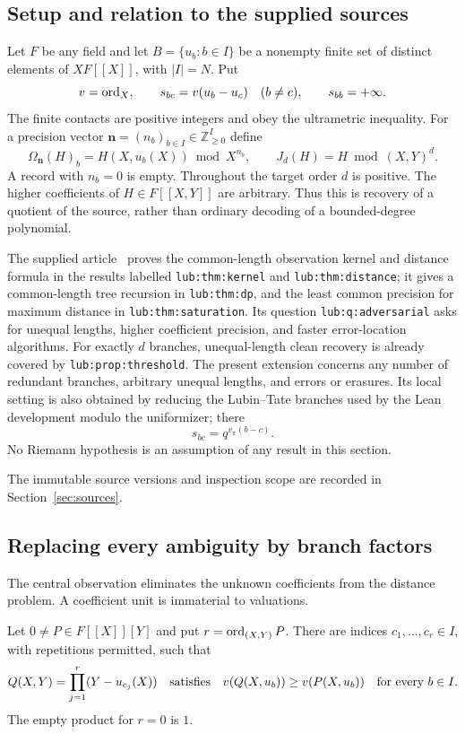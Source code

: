 \subsection{Setup and relation to the supplied sources}

Let $F$ be any field and let $B=\{u_b:b\in I\}$ be a nonempty finite set
of distinct elements of $XF[[X]]$, with $|I|=N$. Put
\[
 v=\operatorname{ord}_X,\qquad s_{bc}=v(u_b-u_c)\quad(b\ne c),\qquad s_{bb}=+\infty.
\]
The finite contacts are positive integers and obey the ultrametric inequality.
For a precision vector $\mathbf n=(n_b)_{b\in I}\in\mathbb Z_{\ge0}^I$ define
\[
 \Omega_{\mathbf n}(H)_b=H(X,u_b(X))\bmod X^{n_b},\qquad
 J_d(H)=H\bmod (X,Y)^d.
\]
A record with $n_b=0$ is empty. Throughout the target order $d$ is positive.
The higher coefficients of $H\in F[[X,Y]]$ are arbitrary. Thus this is
recovery of a quotient of the source, rather than ordinary decoding of a
bounded-degree polynomial.

The supplied article~\cite{Source} proves the common-length observation kernel and distance
formula in the results labelled \texttt{lub:thm:kernel} and
\texttt{lub:thm:distance}; it gives a common-length tree recursion in
\texttt{lub:thm:dp}, and the least common precision for maximum distance in
\texttt{lub:thm:saturation}. Its question \texttt{lub:q:adversarial} asks for
unequal lengths, higher coefficient precision, and faster error-location
algorithms. For exactly $d$ branches, unequal-length clean recovery is already
covered by \texttt{lub:prop:threshold}. The present extension concerns any
number of redundant branches, arbitrary unequal lengths, and errors or
erasures. Its local setting is also obtained by reducing the Lubin--Tate
branches used by the Lean development modulo the uniformizer; there
\[
 s_{bc}=q^{v_\pi(b-c)}.
\]
No Riemann hypothesis is an assumption of any result in this section.

The immutable source versions and inspection scope are recorded in Section~\ref{sec:sources}.

\subsection{Replacing every ambiguity by branch factors}

The central observation eliminates the unknown coefficients from the
distance problem. A coefficient unit is immaterial to valuations.

\begin{lemma}\label{lem:domination}
Let $0\ne P\in F[[X]][Y]$ and put
$r=\operatorname{ord}_{(X,Y)}P$. There are indices $c_1,\ldots,c_r\in I$, with repetitions
permitted, such that
\[
 Q(X,Y)=\prod_{j=1}^r(Y-u_{c_j}(X))
 \quad\hbox{satisfies}\quad
 v(Q(X,u_b))\ge v(P(X,u_b))\quad\hbox{for every }b\in I.
\]
The empty product for $r=0$ is $1$.
\end{lemma}

